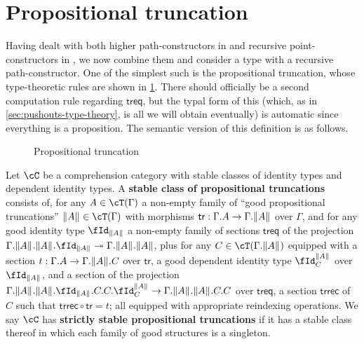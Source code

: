 \documentclass{amsart}
\let\C\cC
\let\T\cT
\def\tr{\mathsf{tr}}
\def\treq{\mathsf{treq}}
\def\trrec{\mathsf{trrec}}
\let\Id\fId
\let\type\fibtype
\renewcommand{\idover}[4][]{\fId_{#1}^{#4}(#2,#3)}
\begin{document}
\section{Propositional truncation}
\label{sec:prop-trunc}

Having dealt with both higher path-constructors in  and recursive point-constructors in , we now combine them and consider a type with a recursive path-constructor.
One of the simplest such is the propositional truncation, whose type-theoretic rules are shown in \cref{fig:proptrunc}.
There should officially be a second computation rule regarding $\treq$, but the typal form of this (which, as in \cref{sec:pushouts-type-theory}, is all we will obtain eventually) is automatic since everything is a proposition.
The semantic version of this definition is as follows.

\begin{figure}
  \centering
  \caption{Propositional truncation}
  \label{fig:proptrunc}
\end{figure}

\begin{defn}\label{defn:proptrunc}
  Let $\C$ be a comprehension category with stable classes of identity types and dependent identity types.
  A \textbf{stable class of propositional truncations} consists of, for any $A\in\T(\Gamma)$ a non-empty family of ``good propositional truncations'' $\brck A\in\T(\Gamma)$ with morphisms $\tr: \Gamma.A \to \Gamma.\brck A$ over $\Gamma$, and for any good identity type $\Id_{\brck A}$ a non-empty family of sections $\treq$ of the projection $\Gamma.\brck A.\brck A.\Id_{\brck A} \fib \Gamma.\brck A.\brck A$, plus for any $C\in\T(\Gamma.\brck A)$ equipped with a section $t:\Gamma.A\to\Gamma.\mathopen{}\left\Vert A\right\Vert_{}\mathclose{}.C$ over $\tr$, a good dependent identity type $\Id^{\brck A}_C$ over $\Id_{\brck A}$, and a section of the projection $\Gamma.\brck A.\brck A.\Id_{\brck A}.C.C.\Id^{\brck A}_C \to \Gamma.\brck A.\brck A.C.C$ over  $\treq$, a section $\trrec$ of $C$ such that $\trrec \circ \tr = t$; all equipped with appropriate reindexing operations.
  We say $\C$ has \textbf{strictly stable propositional truncations} if it has a stable class thereof in which each family of good structures is a singleton.
\end{defn}
\end{document}
